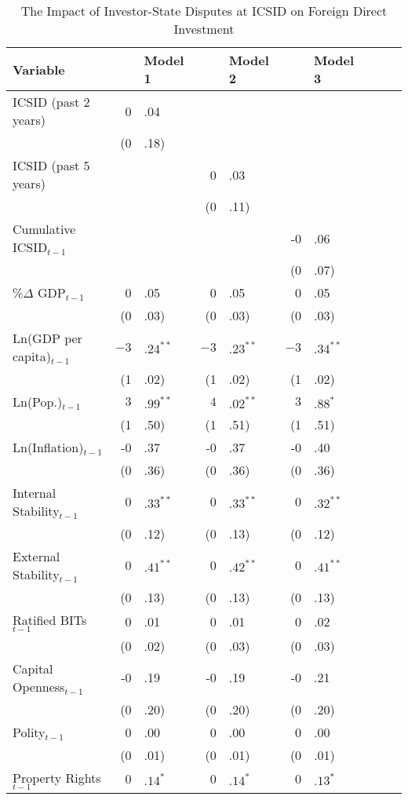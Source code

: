 \documentclass[12pt,onesided]{amsart}
\begin{document}
\begin{table}[ht]
\centering
\caption{The Impact of Investor-State Disputes at ICSID on Foreign Direct Investment}
\label{tab:dispFDI}
{\footnotesize
\begin{tabular}{lr@{} lr@{}lr@{}lr@{}lr@{}}
 Variable && Model 1 && Model 2 && Model 3 \\ 
  \hline
\hline
ICSID  (past 2 years) & 0&.04 &&  &&  \\ 
   & (0&.18) &&  &&  \\ 
  ICSID  (past 5 years) &&  & 0&.03 &&  \\ 
   &&  & (0&.11) &&  \\ 
  Cumulative ICSID$_{t-1}$ &&  &&  & -0&.06 \\ 
   &&  &&  & (0&.07) \\ 
  \%$\Delta$ GDP$_{t-1}$ & 0&.05 & 0&.05 & 0&.05 \\ 
   & (0&.03) & (0&.03) & (0&.03) \\ 
  Ln(GDP per capita)$_{t-1}$ & $-3$&$.24^{\ast\ast}$ & $-3$&$.23^{\ast\ast}$ & $-3$&$.34^{\ast\ast}$ \\ 
   & (1&.02) & (1&.02) & (1&.02) \\ 
  Ln(Pop.)$_{t-1}$ & $3$&$.99^{\ast\ast}$ & $4$&$.02^{\ast\ast}$ & $3$&$.88^{\ast}$ \\ 
   & (1&.50) & (1&.51) & (1&.51) \\ 
  Ln(Inflation)$_{t-1}$ & -0&.37 & -0&.37 & -0&.40 \\ 
   & (0&.36) & (0&.36) & (0&.36) \\ 
  Internal Stability$_{t-1}$ & $0$&$.33^{\ast\ast}$ & $0$&$.33^{\ast\ast}$ & $0$&$.32^{\ast\ast}$ \\ 
   & (0&.12) & (0&.13) & (0&.12) \\ 
  External Stability$_{t-1}$ & $0$&$.41^{\ast\ast}$ & $0$&$.42^{\ast\ast}$ & $0$&$.41^{\ast\ast}$ \\ 
   & (0&.13) & (0&.13) & (0&.13) \\ 
  Ratified BITs$_{t-1}$ & 0&.01 & 0&.01 & 0&.02 \\ 
   & (0&.02) & (0&.03) & (0&.03) \\ 
  Capital Openness$_{t-1}$ & -0&.19 & -0&.19 & -0&.21 \\ 
   & (0&.20) & (0&.20) & (0&.20) \\ 
  Polity$_{t-1}$ & 0&.00 & 0&.00 & 0&.00 \\ 
   & (0&.01) & (0&.01) & (0&.01) \\ 
  Property Rights$_{t-1}$ & $0$&$.14^{\ast}$ & $0$&$.14^{\ast}$ & $0$&$.13^{\ast}$ \\ 

\end{tabular}}
\end{table}
\end{document}
